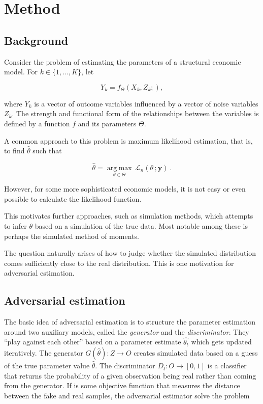 \section{Method}
\label{sec:method}

\subsection{Background}
\label{sec:background}

Consider the problem of estimating the parameters of a structural economic model.
For $k \in \{1,\dots,K\}$, let

\begin{equation}
    Y_k = f_{\Theta}(X_k, Z_k; ),
\end{equation}

where $Y_k$ is a vector of outcome variables influenced by a vector of noise variables $Z_k$. %
The strength and functional form of the relationships between the variables is defined by a function $f$ and its parameters $\Theta$.

A common approach to this problem is maximum likelihood estimation, that is, to find $\hat{\theta}$ such that

\begin{equation}
    \hat{\theta} = \underset{\theta\in\Theta}{\operatorname{arg\;max}}\,\mathcal{L}_{n}(\theta\,;\mathbf{y}) ~.
\end{equation}

However, for some more sophisticated economic models, it is not easy or even possible to calculate the likelihood function.

This motivates further approaches, such as simulation methods, which attempts to infer $\theta$ based on a simulation of the true data.
Most notable among these is perhaps the simulated method of moments.

The question naturally arises of how to judge whether the simulated distribution comes sufficiently close to the real distribution.
This is one motivation for adversarial estimation.

\subsection{Adversarial estimation}
\label{sec:adversarial_estimation}

The basic idea of adversarial estimation is to structure the parameter estimation around two auxiliary models, called the \textit{generator} and the \textit{discriminator}.
They ``play against each other'' based on a parameter estimate $\hat{\theta_{t}}$ which gets updated iteratively. 
The generator $G(\hat{\theta}) : Z \rightarrow O$ creates simulated data based on a guess of the true parameter value $\hat{\theta}$.
The discriminator $D_t : O \rightarrow [0 , 1]$ is a classifier that returns the probability of a given observation being real rather than coming from the generator.
If  is some objective function that measures the distance between the fake and real samples, the adversarial estimator solve the problem
 
